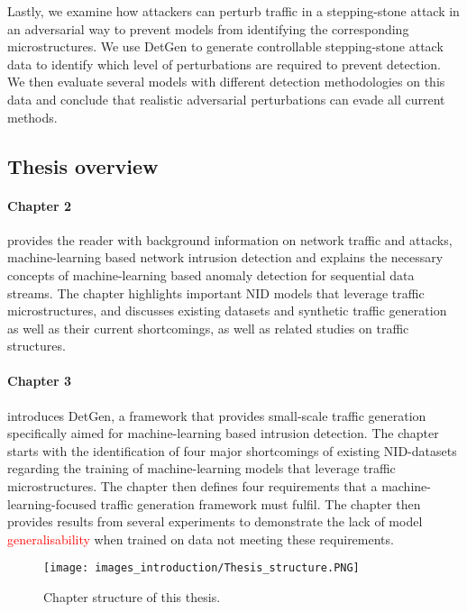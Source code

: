 Lastly, we examine how attackers can perturb traffic in a stepping-stone attack in an adversarial way to prevent models from identifying the corresponding microstructures. We use DetGen to generate controllable stepping-stone attack data to identify which level of perturbations are required to prevent detection. We then evaluate several models with different detection methodologies on this data and conclude that realistic adversarial perturbations can evade all current methods.

\subsection{Thesis overview}

\paragraph*{Chapter 2} provides the reader with background information on network traffic and attacks, machine-learning based network intrusion detection and explains the necessary concepts of machine-learning based anomaly detection for sequential data streams. The chapter highlights important NID models that leverage traffic microstructures, and discusses existing datasets and synthetic traffic generation as well as their current shortcomings, as well as related studies on traffic structures.

\paragraph*{Chapter 3} introduces DetGen, a framework that provides small-scale traffic generation specifically aimed for machine-learning based intrusion detection. The chapter starts with the identification of four major shortcomings of existing NID-datasets regarding the training of machine-learning models that leverage traffic microstructures. The chapter then defines four requirements that a machine-learning-focused traffic generation framework must fulfil. The chapter then provides results from several experiments to demonstrate the lack of model \textcolor{red}{generalisability} when trained on data not meeting these requirements. 

\begin{figure}[h]
\centering
\texttt{[image: images\_introduction/Thesis\_structure.PNG]}
\caption{Chapter structure of this thesis.}\label{Fig:structure}
\end{figure}

